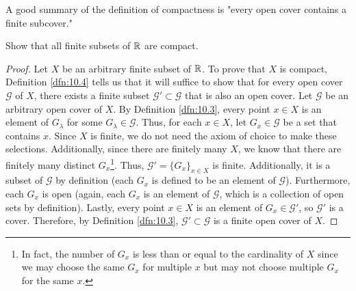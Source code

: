 \documentclass[../main.tex]{subfiles}
\begin{document}
A good summary of the definition of compactness is "every open cover contains a finite subcover."

\begin{exercise}\label{exr:10.5}
    Show that all finite subsets of $\mathbb{R}$ are compact.
    \begin{proof}
        Let $X$ be an arbitrary finite subset of $\mathbb{R}$. To prove that $X$ is compact, Definition \ref{dfn:10.4} tells us that it will suffice to show that for every open cover $\mathcal{G}$ of $X$, there exists a finite subset $\mathcal{G}'\subset\mathcal{G}$ that is also an open cover. Let $\mathcal{G}$ be an arbitrary open cover of $X$. By Definition \ref{dfn:10.3}, every point $x\in X$ is an element of $G_\lambda$ for some $G_\lambda\in\mathcal{G}$. Thus, for each $x\in X$, let $G_x\in\mathcal{G}$ be a set that contains $x$. Since $X$ is finite, we do not need the axiom of choice to make these selections. Additionally, since there are finitely many $X$, we know that there are finitely many distinct $G_x$\footnote{In fact, the number of $G_x$ is less than or equal to the cardinality of $X$ since we may choose the same $G_x$ for multiple $x$ but may not choose multiple $G_x$ for the same $x$.}. Thus, $\mathcal{G}'=\{G_x\}_{x\in X}$ is finite. Additionally, it is a subset of $\mathcal{G}$ by definition (each $G_x$ is defined to be an element of $\mathcal{G}$). Furthermore, each $G_x$ is open (again, each $G_x$ is an element of $\mathcal{G}$, which is a collection of open sets by definition). Lastly, every point $x\in X$ is an element of $G_x\in\mathcal{G}'$, so $\mathcal{G}'$ is a cover. Therefore, by Definition \ref{dfn:10.3}, $\mathcal{G}'\subset\mathcal{G}$ is a finite open cover of $X$.
    \end{proof}
\end{exercise}
\end{document}
